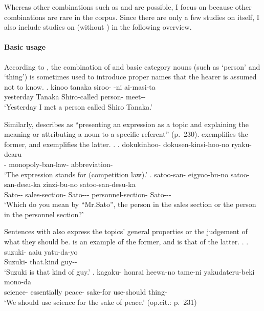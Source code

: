 Whereas other combinations such as  and  are possible,
I focus on  because other combinations are rare in the corpus.
Since there are only a few studies on  itself,
I also include studies on  (without ) in the following overview.

\paragraph{Basic usage}

According to ,
the combination of
 and basic category nouns (such as  `person' and  `thing') is sometimes used to introduce proper names that the hearer is assumed not to know.
%
\exg. kinoo tanaka siroo- -ni ai-masi-ta \\
	yesterday Tanaka Shiro-called person- meet-- \\
	`Yesterday I met a person called Shiro Tanaka.'
	\hfill{\cite[][p.\ 218]{takubo89}}


Similarly,  describes  as
``presenting an expression as a topic and explaining the meaning or
attributing a noun to a specific referent'' (p.~230).
\Next[a] exemplifies the former, and
\Next[b] exemplifies the latter.
%
\ex.
 \ag. dokukinhoo- dokusen-kinsi-hoo-no ryaku-dearu \\
      - monopoly-ban-law- abbreviation- \\
      `The expression  stands for  (competition law).'
 \bg. satoo-san- eigyoo-bu-no satoo-san-desu-ka zinzi-bu-no satoo-san-desu-ka\\
      Sato-- sales-section- Sato--- personnel-section- Sato---\\
      `Which do you mean by ``Mr.Sato'', the person in the sales section or the person in the personnel section?'
      \hfill{\cite[p.~230]{kijutubumpokenkyukai09}}


Sentences with  also express
the topics' general properties or the judgement of what they should be.
\Next[a] is an example of the former, and
\Next[b] is that of the latter.
%
\ex.
 \ag. suzuki- aaiu yatu-da-yo \\
      Suzuki- that.kind guy-- \\
      `Suzuki is that kind of guy.'
 \bg. kagaku- honrai heewa-no tame-ni yakudateru-beki mono-da \\
      science- essentially peace- sake-for use-should thing- \\
      `We should use science for the sake of peace.'
      \hfill{(op.cit.: p.~231)}


